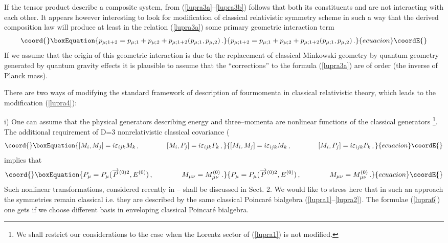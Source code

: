 \documentclass[a4paper,a4paper]{article}
\begin{document}
If the tensor product \coordHE{} describe a composite
system,  from (\ref{lupra3a}--\ref{lupra3b}) follows that both its
constituents \coordHE{} and \coordHE{} are not interacting with each other.
It appears however interesting to look for modification of
classical relativistic symmetry scheme in such a way that the
derived composition law will produce at least in the relation
(\ref{lupra3a}) some primary geometric interaction term
\begin{equation}\coord{}\boxEquation{\label{lupra4}
  p_{\mu;1+2} = p_{\mu;1} + p_{\mu;2} +
  p_{\mu;1+2}(p_{\mu;1},p_{\mu,2})\, .
}{p_{\mu;1+2} = p_{\mu;1} + p_{\mu;2} +
  p_{\mu;1+2}(p_{\mu;1},p_{\mu,2})\, .
}{ecuacion}\coordE{}\end{equation}
If we assume that the origin of this geometric interaction is due
to the replacement of classical Minkowski geometry by quantum
geometry generated by quantum gravity effects it is plausible to
assume that the ``corrections''  to the formula (\ref{lupra3a})
are of order  \coordHE{} (the inverse of Planck mass).

There are two ways of modifying the standard framework of
description of fourmomenta in classical relativistic theory,
which leads to the modification (\ref{lupra4}):

i) One can assume that the physical generators \coordHE{} 
describing
energy and three--momenta are nonlinear functions of the classical
generators \coordHE{}\footnote{We shall restrict our
considerations to the case when the Lorentz sector of
(\ref{lupra1}) is not modified.}. The additional requirement of
D=3 nonrelativistic classical covariance (\coordHE{}
\begin{equation}\coord{}\boxEquation{\label{lupra5}
  [M_i , M_j ] = i \varepsilon_{ijk}M_k \, , \qquad \qquad
  [M_i , P_j ] = i\varepsilon_{ijk}P_k \, ,
}{[M_i , M_j ] = i \varepsilon_{ijk}M_k \, , \qquad \qquad
  [M_i , P_j ] = i\varepsilon_{ijk}P_k \, ,
}{ecuacion}\coordE{}\end{equation}
implies that
\begin{equation}\coord{}\boxEquation{\label{lupra6}
P_\mu = P_\mu ( \overrightarrow{P}^{(0)2} , E^{(0)})\, ,\qquad
\qquad M_{\mu\nu} = M^{(0)}_{\mu\nu}\, .
}{P_\mu = P_\mu ( \overrightarrow{P}^{(0)2} , E^{(0)})\, ,\qquad
\qquad M_{\mu\nu} = M^{(0)}_{\mu\nu}\, .
}{ecuacion}\coordE{}\end{equation}
Such nonlinear transformations, considered recently in
\cite{ms}--\cite{ag} shall be discussed in Sect. 2. We would like
to stress here that in such an approach the symmetries remain
classical i.e. they are described by the  same classical
Poincar\'{e} bialgebra (\ref{lupra1}--\ref{lupra2}). The formulae
(\ref{lupra6}) one gets if we choose different basis  in
enveloping classical Poincar\'{e} bialgebra.
\end{document}

